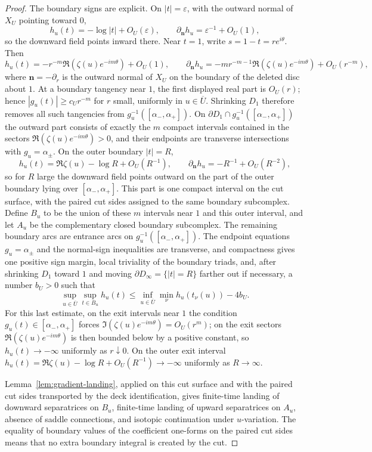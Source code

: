 \documentclass[reqno]{article}
\theoremstyle{definition}
\theoremstyle{remark}
\theoremstyle{plain}
\begin{document}
\begin{proof}
The boundary signs are explicit. On \(|t|=\varepsilon\), with the outward normal of \(X_U\) pointing toward \(0\),
\[
h_u(t)=-\log|t|+O_U(\varepsilon),\qquad
\partial_{\mathbf n}h_u=\varepsilon^{-1}+O_U(1),
\]
so the downward field points inward there. Near \(t=1\), write \(s=1-t=re^{i\theta}\). Then
\[
h_u(t)=-r^{-m}\Re(\zeta(u)e^{-im\theta})+O_U(1),\qquad
\partial_{\mathbf n}h_u=-m r^{-m-1}\Re(\zeta(u)e^{-im\theta})+O_U(r^{-m}),
\]
where \(\mathbf n=-\partial_r\) is the outward normal of \(X_U\) on the boundary of the deleted disc about \(1\). At a boundary tangency near \(1\), the first displayed real part is \(O_U(r)\); hence \(|g_u(t)|\ge c_Ur^{-m}\) for \(r\) small, uniformly in \(u\in\overline U\). Shrinking \(D_1\) therefore removes all such tangencies from \(g_u^{-1}([\alpha_-,\alpha_+])\). On \(\partial D_1\cap g_u^{-1}([\alpha_-,\alpha_+])\) the outward part consists of exactly the \(m\) compact intervals contained in the sectors \(\Re(\zeta(u)e^{-im\theta})>0\), and their endpoints are transverse intersections with \(g_u=\alpha_\pm\). On the outer boundary \(|t|=R\),
\[
h_u(t)=\Re\zeta(u)-\log R+O_U(R^{-1}),\qquad
\partial_{\mathbf n}h_u=-R^{-1}+O_U(R^{-2}),
\]
so for \(R\) large the downward field points outward on the part of the outer boundary lying over \([\alpha_-,\alpha_+]\). This part is one compact interval on the cut surface, with the paired cut sides assigned to the same boundary subcomplex. Define \(B_u\) to be the union of these \(m\) intervals near \(1\) and this outer interval, and let \(A_u\) be the complementary closed boundary subcomplex. The remaining boundary arcs are entrance arcs on \(g_u^{-1}([\alpha_-,\alpha_+])\). The endpoint equations \(g_u=\alpha_\pm\) and the normal-sign inequalities are transverse, and compactness gives one positive sign margin, local triviality of the boundary triads, and, after shrinking \(D_1\) toward \(1\) and moving \(\partial D_\infty=\{|t|=R\}\) farther out if necessary, a number \(b_U>0\) such that
\[
\sup_{u\in\overline U}\sup_{t\in B_u}h_u(t)
\le
\inf_{u\in\overline U}\min_\nu h_u(t_\nu(u))-4b_U .
\]
For this last estimate, on the exit intervals near \(1\) the condition \(g_u(t)\in[\alpha_-,\alpha_+]\) forces \(\Im(\zeta(u)e^{-im\theta})=O_U(r^m)\); on the exit sectors \(\Re(\zeta(u)e^{-im\theta})\) is then bounded below by a positive constant, so \(h_u(t)\to-\infty\) uniformly as \(r\downarrow0\). On the outer exit interval \(h_u(t)=\Re\zeta(u)-\log R+O_U(R^{-1})\to-\infty\) uniformly as \(R\to\infty\).

Lemma~\ref{lem:gradient-landing}, applied on this cut surface and with the paired cut sides transported by the deck identification, gives finite-time landing of downward separatrices on \(B_u\), finite-time landing of upward separatrices on \(A_u\), absence of saddle connections, and isotopic continuation under \(u\)-variation. The equality of boundary values of the coefficient one-forms on the paired cut sides means that no extra boundary integral is created by the cut.


\end{proof}
\end{document}
